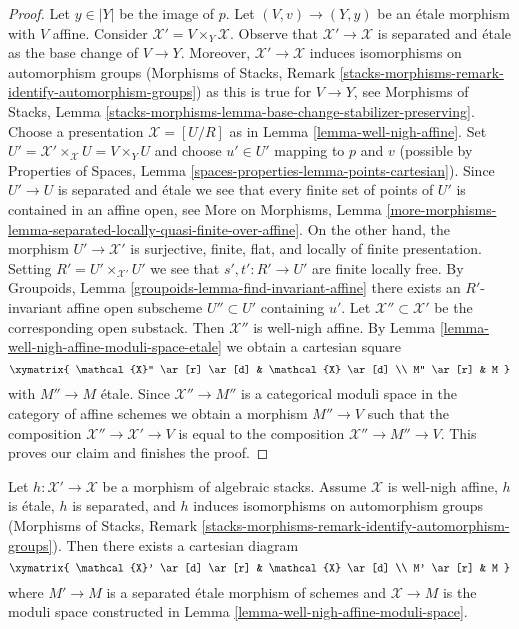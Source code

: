 \begin{proof}
\medskip\noindent
Let $y \in |Y|$ be the image of $p$.
Let $(V, v) \to (Y, y)$ be an \'etale morphism with $V$ affine.
Consider $\mathcal{X}' = V \times_Y \mathcal{X}$.
Observe that $\mathcal{X}' \to \mathcal{X}$ is separated and \'etale
as the base change of $V \to Y$. Moreover, $\mathcal{X}' \to \mathcal{X}$
induces isomorphisms on automorphism groups
(Morphisms of Stacks, Remark
\ref{stacks-morphisms-remark-identify-automorphism-groups})
as this is true for
$V \to Y$, see Morphisms of Stacks, Lemma
\ref{stacks-morphisms-lemma-base-change-stabilizer-preserving}.
Choose a presentation $\mathcal{X} = [U/R]$
as in Lemma \ref{lemma-well-nigh-affine}.
Set $U' = \mathcal{X}' \times_\mathcal{X} U = V \times_Y U$
and choose $u' \in U'$ mapping to $p$ and $v$ (possible
by Properties of Spaces, Lemma \ref{spaces-properties-lemma-points-cartesian}).
Since $U' \to U$ is separated and \'etale we see that
every finite set of points of $U'$ is contained in an affine open, see
More on Morphisms, Lemma
\ref{more-morphisms-lemma-separated-locally-quasi-finite-over-affine}.
On the other hand, the morphism $U' \to \mathcal{X}'$ is
surjective, finite, flat, and locally of finite presentation.
Setting $R' = U' \times_{\mathcal{X}'} U'$ we see
that $s', t' : R' \to U'$ are finite locally free.
By Groupoids, Lemma \ref{groupoids-lemma-find-invariant-affine}
there exists an $R'$-invariant affine open subscheme $U'' \subset U'$
containing $u'$.
Let $\mathcal{X}'' \subset \mathcal{X}'$ be
the corresponding open substack. Then $\mathcal{X}''$ is
well-nigh affine. By Lemma \ref{lemma-well-nigh-affine-moduli-space-etale}
we obtain a cartesian square
$$
\xymatrix{
\mathcal{X}'' \ar[r] \ar[d] & \mathcal{X} \ar[d] \\
M'' \ar[r] & M
}
$$
with $M'' \to M$ \'etale. Since $\mathcal{X}'' \to M''$ is
a categorical moduli space in the category of affine schemes
we obtain a morphism $M'' \to V$ such that the composition
$\mathcal{X}'' \to \mathcal{X}' \to V$ is equal to the composition
$\mathcal{X}'' \to M'' \to V$. This proves our claim and finishes
the proof.
\end{proof}

\begin{lemma}
\label{lemma-etale-separated-over-well-nigh-affine}
Let $h : \mathcal{X}' \to \mathcal{X}$ be a morphism of algebraic stacks.
Assume $\mathcal{X}$ is well-nigh affine, $h$ is \'etale, $h$ is separated,
and $h$ induces isomorphisms on automorphism groups
(Morphisms of Stacks, Remark
\ref{stacks-morphisms-remark-identify-automorphism-groups}).
Then there exists a cartesian diagram
$$
\xymatrix{
\mathcal{X}' \ar[d] \ar[r] & \mathcal{X} \ar[d] \\
M' \ar[r] & M
}
$$
where $M' \to M$ is a separated \'etale morphism of schemes and
$\mathcal{X} \to M$ is the moduli space constructed in
Lemma \ref{lemma-well-nigh-affine-moduli-space}.
\end{lemma}

